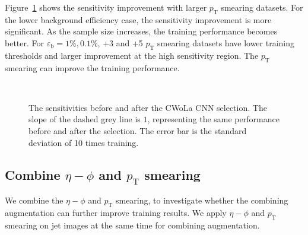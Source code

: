 \documentclass[12pt]{article}
\begin{document}
		Figure~\ref{fig:sensitivity_improvement_origin_pt_aug_1_3_5} shows the sensitivity improvement with larger $p_{\text{T}}$ smearing datasets. For the lower background efficiency case, the sensitivity improvement is more significant. As the sample size increases, the training performance becomes better. For $\varepsilon_{\text{b}} = 1 \%, 0.1 \%$, +3 and +5 $p_{\text{T}}$ smearing datasets have lower training thresholds and larger improvement at the high sensitivity region. The $p_{\text{T}}$ smearing can improve the training performance.
		\begin{figure}[htpb]
			\centering
			 \\
			\caption{The sensitivities before and after the CWoLa CNN selection. The slope of the dashed grey line is $1$, representing the same performance before and after the selection. The error bar is the standard deviation of 10 times training.}
			\label{fig:sensitivity_improvement_origin_pt_aug_1_3_5}
		\end{figure}
	\subsection{Combine \texorpdfstring{$\eta-\phi$}{eta-phi} and \texorpdfstring{$p_{\mathrm{T}}$}{pT} smearing}%
	\label{sub:combine_eta_phi_and_pt_smearing}
		We combine the $\eta-\phi$ and $p_{\text{T}}$ smearing, to investigate whether the combining augmentation can further improve training results. We apply $\eta-\phi$ and $p_{\text{T}}$ smearing on jet images at the same time for combining augmentation.
\end{document}
